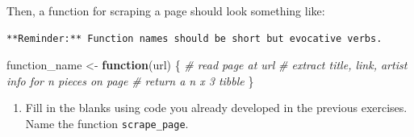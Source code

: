 \documentclass[
]{article}
\newenvironment{Shaded}{\begin{snugshade}}{\end{snugshade}}
\newcommand{\CommentTok}[1]{\textcolor[rgb]{0.56,0.35,0.01}{\textit{#1}}}
\newcommand{\ControlFlowTok}[1]{\textcolor[rgb]{0.13,0.29,0.53}{\textbf{#1}}}
\newcommand{\NormalTok}[1]{#1}
\newcommand{\OtherTok}[1]{\textcolor[rgb]{0.56,0.35,0.01}{#1}}
\providecommand{\tightlist}{%
  \setlength{\itemsep}{0pt}\setlength{\parskip}{0pt}}
\begin{document}
Then, a function for scraping a page should look something like:

\begin{verbatim}
**Reminder:** Function names should be short but evocative verbs.
\end{verbatim}

\begin{Shaded}
\begin{Highlighting}[]
\NormalTok{function\_name }\OtherTok{\textless{}{-}} \ControlFlowTok{function}\NormalTok{(url) \{}
  \CommentTok{\# read page at url}
  \CommentTok{\# extract title, link, artist info for n pieces on page}
  \CommentTok{\# return a n x 3 tibble}
\NormalTok{\}}
\end{Highlighting}
\end{Shaded}

\begin{enumerate}
\def\labelenumi{\arabic{enumi}.}
\setcounter{enumi}{4}
\tightlist
\item
  Fill in the blanks using code you already developed in the previous
  exercises. Name the function \texttt{scrape\_page}.
\end{enumerate}
\end{document}

